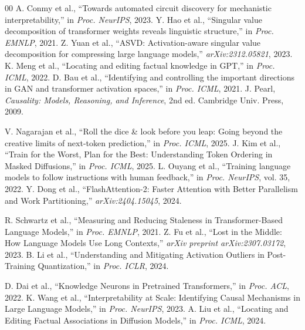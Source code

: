 \documentclass[conference]{IEEEtran}
\begin{document}
\begin{thebibliography}{00}
 A. Conmy et al., ``Towards automated circuit discovery for mechanistic interpretability,'' in \emph{Proc. NeurIPS}, 2023.
 Y. Hao et al., ``Singular value decomposition of transformer weights reveals linguistic structure,'' in \emph{Proc. EMNLP}, 2021.
 Z. Yuan et al., ``ASVD: Activation-aware singular value decomposition for compressing large language models,'' \emph{arXiv:2312.05821}, 2023.
 K. Meng et al., ``Locating and editing factual knowledge in GPT,'' in \emph{Proc. ICML}, 2022.
 D. Bau et al., ``Identifying and controlling the important directions in GAN and transformer activation spaces,'' in \emph{Proc. ICML}, 2021.
 J. Pearl, \emph{Causality: Models, Reasoning, and Inference}, 2nd ed. Cambridge Univ. Press, 2009.

 V. Nagarajan et al., ``Roll the dice \& look before you leap: Going beyond the creative limits of next-token prediction,'' in \textit{Proc. ICML}, 2025.
 J. Kim et al., ``Train for the Worst, Plan for the Best: Understanding Token Ordering in Masked Diffusions,'' in \textit{Proc. ICML}, 2025.
 L. Ouyang et al., ``Training language models to follow instructions with human feedback,'' in \emph{Proc. NeurIPS}, vol. 35, 2022.
 Y. Dong et al., ``FlashAttention-2: Faster Attention with Better Parallelism and Work Partitioning,'' \emph{arXiv:2404.15045}, 2024.

 R. Schwartz et al., ``Measuring and Reducing Staleness in Transformer-Based Language Models,'' in \emph{Proc. EMNLP}, 2021.
 Z. Fu et al., ``Lost in the Middle: How Language Models Use Long Contexts,'' \emph{arXiv preprint arXiv:2307.03172}, 2023.
 B. Li et al., ``Understanding and Mitigating Activation Outliers in Post-Training Quantization,'' in \emph{Proc. ICLR}, 2024.

 D. Dai et al., ``Knowledge Neurons in Pretrained Transformers,'' in \emph{Proc. ACL}, 2022.
 K. Wang et al., ``Interpretability at Scale: Identifying Causal Mechanisms in Large Language Models,'' in \emph{Proc. NeurIPS}, 2023.
 A. Liu et al., ``Locating and Editing Factual Associations in Diffusion Models,'' in \emph{Proc. ICML}, 2024.


\end{thebibliography}
\end{document}
